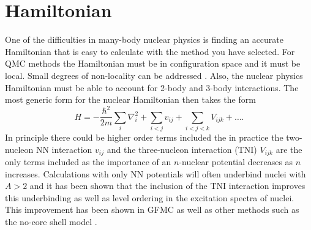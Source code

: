 \section{Hamiltonian}
One of the difficulties in many-body nuclear physics is finding an accurate Hamiltonian that is easy to calculate with the method you have selected. For QMC methods the Hamiltonian must be in configuration space and it must be local. Small degrees of non-locality can be addressed \cite{lynn2012,lynn2013}. Also, the nuclear physics Hamiltonian must be able to account for 2-body and 3-body interactions. The most generic form for the nuclear Hamiltonian then takes the form
\begin{equation}
   H = -\frac{\hbar^2}{2m}\sum\limits_i \nabla_i^2 + \sum\limits_{i<j} v_{ij} + \sum\limits_{i<j<k} V_{ijk} + \ldots.
\end{equation}
In principle there could be higher order terms included the in practice the two-nucleon NN interaction $v_{ij}$ and the three-nucleon interaction (TNI) $V_{ijk}$ are the only terms included as the importance of an $n$-nuclear potential decreases as $n$ increases. Calculations with only NN potentials will often underbind nuclei with $A>2$ and it has been shown that the inclusion of the TNI interaction improves this underbinding as well as level ordering in the excitation spectra of nuclei. This improvement has been shown in GFMC \cite{fantoni2008} as well as other methods such as the no-core shell model \cite{navratil2003}.

